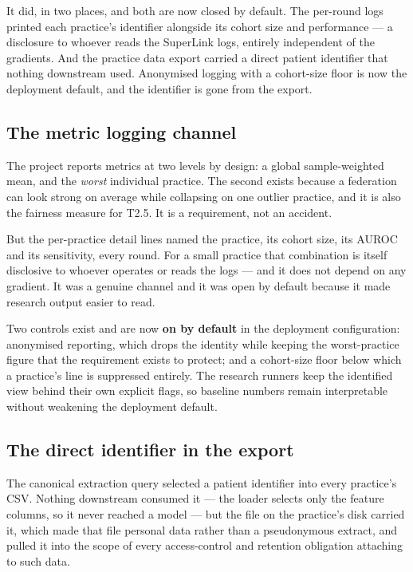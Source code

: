 \label{sec:sidechannels}
\statusMethod

\begin{shortanswer}
It did, in two places, and both are now closed by default. The per-round logs printed each
practice's identifier alongside its cohort size and performance --- a disclosure to whoever reads
the SuperLink logs, entirely independent of the gradients. And the practice data export carried a
direct patient identifier that nothing downstream used. Anonymised logging with a cohort-size floor
is now the deployment default, and the identifier is gone from the export.
\end{shortanswer}

\subsection{The metric logging channel}

The project reports metrics at two levels by design: a global sample-weighted mean, and the
\emph{worst} individual practice. The second exists because a federation can look strong on average
while collapsing on one outlier practice, and it is also the fairness measure for T2.5. It is a
requirement, not an accident.

But the per-practice detail lines named the practice, its cohort size, its AUROC and its
sensitivity, every round. For a small practice that combination is itself disclosive to whoever
operates or reads the logs --- and it does not depend on any gradient. It was a genuine channel and
it was open by default because it made research output easier to read.

Two controls exist and are now \textbf{on by default} in the deployment configuration:
anonymised reporting, which drops the identity while keeping the worst-practice figure that the
requirement exists to protect; and a cohort-size floor below which a practice's line is suppressed
entirely. The research runners keep the identified view behind their own explicit flags, so baseline
numbers remain interpretable without weakening the deployment default.

\subsection{The direct identifier in the export}

The canonical extraction query selected a patient identifier into every practice's CSV. Nothing
downstream consumed it --- the loader selects only the feature columns, so it never reached a model
--- but the file on the practice's disk carried it, which made that file personal data rather than a
pseudonymous extract, and pulled it into the scope of every access-control and retention obligation
attaching to such data.

